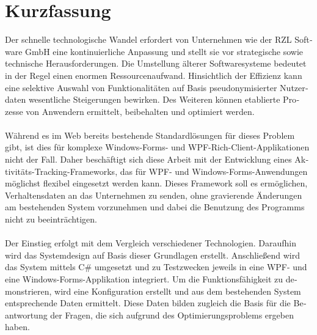 \chapter{Kurzfassung}

\begin{german}

Der schnelle technologische Wandel erfordert von Unternehmen wie der RZL Software GmbH eine kontinuierliche Anpassung und stellt sie vor strategische sowie technische Herausforderungen. Die Umstellung älterer Softwaresysteme bedeutet in der Regel einen enormen Ressourcenaufwand. Hinsichtlich der Effizienz kann eine selektive Auswahl von Funktionalitäten auf Basis pseudonymisierter Nutzerdaten wesentliche Steigerungen bewirken. Des Weiteren können etablierte Prozesse von Anwendern ermittelt, beibehalten und optimiert werden.\\
\\
Während es im Web bereits bestehende Standardlösungen für dieses Problem gibt, ist dies für komplexe Windows-Forms- und WPF-Rich-Client-Applikationen nicht der Fall. Daher beschäftigt sich diese Arbeit mit der Entwicklung eines Aktivitäts-Tracking-Frameworks, das für WPF- und Windows-Forms-Anwendungen möglichst flexibel eingesetzt werden kann. Dieses Framework soll es ermöglichen, Verhaltensdaten an das Unternehmen zu senden, ohne gravierende Änderungen am bestehenden System vorzunehmen und dabei die Benutzung des Programms nicht zu beeinträchtigen.\\
\\
Der Einstieg erfolgt mit dem Vergleich verschiedener Technologien. Daraufhin wird das Systemdesign auf Basis dieser Grundlagen erstellt. Anschließend wird das System mittels C\# umgesetzt und zu Testzwecken jeweils in eine WPF- und eine Windows-Forms-Applikation integriert. Um die Funktionsfähigkeit zu demonstrieren, wird eine Konfiguration erstellt und aus dem bestehenden System entsprechende Daten ermittelt. Diese Daten bilden zugleich die Basis für die Beantwortung der Fragen, die sich aufgrund des Optimierungsproblems ergeben haben.

\end{german}

